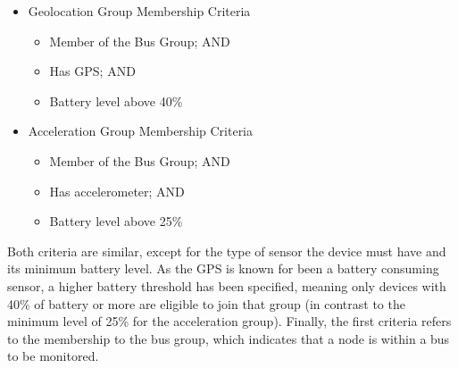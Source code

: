 \begin{itemize}
	
	\item Geolocation Group Membership Criteria
	
	\begin{itemize}
		
		\item Member of the Bus Group; AND
		
		\item Has GPS; AND
		
		\item Battery level above 40\%
		
	\end{itemize}
	
	\item Acceleration Group Membership Criteria
	
	\begin{itemize}
		
		\item Member of the Bus Group; AND
		
		\item Has accelerometer; AND
		
		\item Battery level above 25\%
		
	\end{itemize}
	
\end{itemize}

Both criteria are similar, except for the type of sensor the device must have and its minimum battery level. As the GPS is known for been a battery consuming sensor, a higher battery threshold has been specified, meaning only devices with 40\% of battery or more are eligible to join that group (in contrast to the minimum level of 25\% for the acceleration group). Finally, the first criteria refers to the membership to the bus group, which indicates that a node is within a bus to be monitored.




